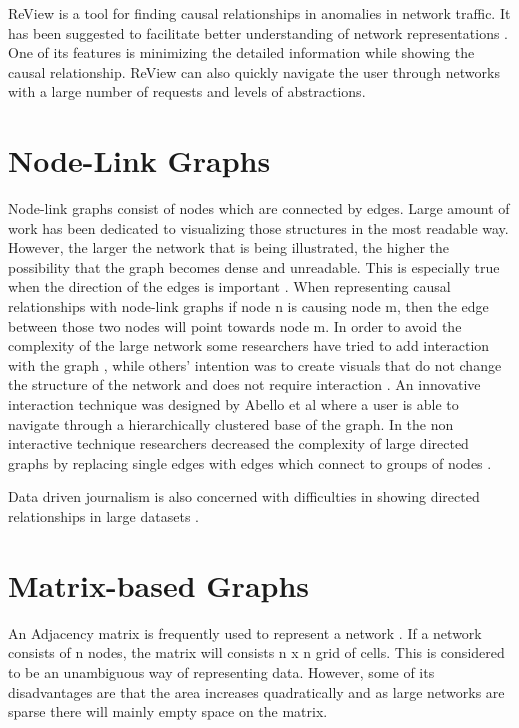 \documentclass{l4proj}
\begin{document}
ReView is a tool for finding causal relationships in anomalies in network traffic. It has been suggested to facilitate better understanding of network representations \cite{Zhang:2015:VTC:2713579.2713583}. One of its features is minimizing the detailed information while showing the causal relationship. ReView can also quickly navigate the user through networks with a large number of requests and levels of abstractions.
\section{Node-Link Graphs}

Node-link graphs consist of nodes which are connected by edges. Large amount of work has been dedicated to visualizing those structures in the most readable way. However, the larger the network that is being illustrated, the higher the possibility that the graph becomes dense and unreadable. This is especially true when the direction of the edges is important \cite{dwyer2013edge}. When representing causal relationships with node-link graphs if node n is causing node m, then the edge between those two nodes will point towards node m. In order to avoid the complexity of the large network some researchers have tried to add interaction with the graph \cite{gansner2005topological}, while others' intention was to create visuals that do not change the structure of the network and does not require interaction \cite{dwyer2013edge}. An innovative interaction technique was designed by Abello et al \cite{abello2006ask} where a user is able to navigate through a hierarchically clustered base of the graph. In the non interactive technique researchers decreased the complexity of large directed graphs by replacing single edges with edges which connect to groups of nodes \cite{dwyer2013edge}.  

Data driven journalism is also concerned with difficulties in showing directed relationships in large datasets \cite{niederer2015survey}.

\section{Matrix-based Graphs}

An Adjacency matrix is frequently used to represent a network \cite{longabaugh2012combing}. If a network consists of n nodes, the matrix will consists n x n grid of cells. This is considered to be an unambiguous way of representing data. However, some of its disadvantages are that the area increases quadratically and as large networks are sparse there will mainly empty space on the matrix.  
\end{document}

